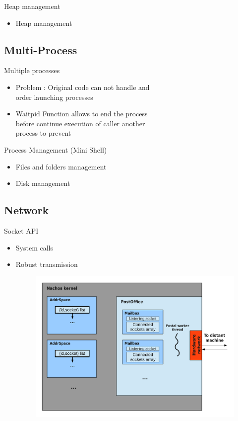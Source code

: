 \documentclass{beamer}
\begin{document}
\begin{frame}{Heap management}
  \begin{itemize}
    \item Heap management
  \end{itemize}
\end{frame}

\subsection{Multi-Process}
\begin{frame}{Multiple processes}
  \begin{itemize}
	\item Problem : Original code can not handle and
	\\order launching processes
    \item Waitpid Function allows to end the process 
    \\before continue execution of caller another
    \\process to prevent
  \end{itemize}
\end{frame}

\begin{frame}{Process Management (Mini Shell)}
  \begin{itemize}
    \item Files and folders management
    \item Disk management
  \end{itemize}
\end{frame}

\subsection{Network}
\begin{frame}{Socket API}
  \begin{itemize}
    \item System calls  
    \item Robust transmission
    \begin{figure}[ht]
		\includegraphics[width=0.7\linewidth]{Networkcolored.pdf}
    \end{figure}
  \end{itemize}
\end{frame}
\end{document}
